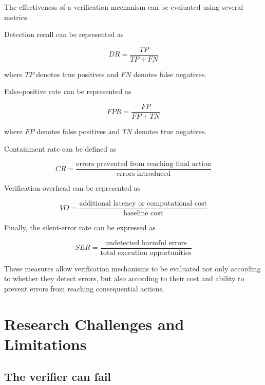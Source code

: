 \documentclass[12pt]{article}
\begin{document}
The effectiveness of a verification mechanism can be evaluated using several
metrics.

Detection recall can be represented as

\begin{equation}
DR=\frac{TP}{TP+FN}
\label{eq:detection-recall}
\end{equation}

where $TP$ denotes true positives and $FN$ denotes false negatives.

False-positive rate can be represented as

\begin{equation}
FPR=\frac{FP}{FP+TN}
\label{eq:false-positive-rate}
\end{equation}

where $FP$ denotes false positives and $TN$ denotes true negatives.

Containment rate can be defined as

\begin{equation}
CR=
\frac{\text{errors prevented from reaching final action}}
{\text{errors introduced}}
\label{eq:containment-rate}
\end{equation}

Verification overhead can be represented as

\begin{equation}
VO=
\frac{\text{additional latency or computational cost}}
{\text{baseline cost}}
\label{eq:verification-overhead}
\end{equation}

Finally, the silent-error rate can be expressed as

\begin{equation}
SER=
\frac{\text{undetected harmful errors}}
{\text{total execution opportunities}}
\label{eq:silent-error-rate}
\end{equation}

These measures allow verification mechanisms to be evaluated not only according
to whether they detect errors, but also according to their cost and ability to
prevent errors from reaching consequential actions.

\section{Research Challenges and Limitations}
\label{sec:limitations}

\subsection{The verifier can fail}
\label{sec:verifier-failure}
\end{document}
